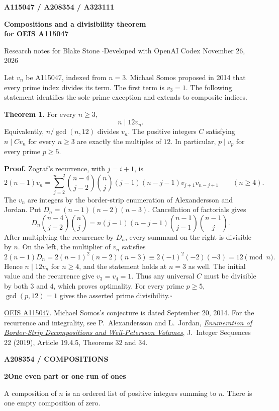 \documentclass[12pt,letterpaper]{article}
\newcommand{\tagline}[1]{{\small\sffamily\bfseries\color{accent}#1}\par}
\newcommand{\titleline}[1]{{\fontsize{23}{27}\selectfont\sffamily\bfseries\color{ink}#1}\par}
\newcommand{\subhead}[1]{\vspace{1pt}{\large\sffamily\bfseries\color{ink}#1}\par}
\newcommand{\lead}[1]{\textbf{\color{ink}#1.}\enspace}
\newcommand{\qedx}{\hfill\(\square\)}
\newcommand{\source}[1]{\vfill{\small\color{muted}#1\par}}
\newcommand{\oeis}[1]{\href{https://oeis.org/#1}{OEIS #1}}
\begin{document}
\thispagestyle{plain}
\tagline{A115047 \enspace / \enspace A208354 \enspace / \enspace A323111}
\titleline{Compositions and a divisibility theorem\\for OEIS A115047}
{\small\sffamily Research notes for Blake Stone \enspace$\cdot$\enspace Developed with OpenAI Codex
 \hfill November 26, 2026}\par
\vspace{6pt}
\subhead{1\quad The smallest universal multiplier}
Let $v_n$ be A115047, indexed from $n=3$. Michael Somos proposed in 2014 that
every prime index divides its term. The first term is $v_3=1$. The following
statement identifies the sole prime exception and extends to composite indices.

\lead{Theorem 1} For every $n\ge3$,
\[
                         n\mid 12v_n .
\]
Equivalently, $n/\gcd(n,12)$ divides $v_n$. The positive integers $C$ satisfying
$n\mid Cv_n$ for every $n\ge3$ are exactly the multiples of $12$. In particular,
$p\mid v_p$ for every prime $p\ge5$.

\lead{Proof} Zograf's recurrence, with $j=i+1$, is
\[
 2(n-1)v_n=\sum_{j=2}^{n-2}\binom{n-4}{j-2}\binom{n}{j}
 (j-1)(n-j-1)v_{j+1}v_{n-j+1}\qquad(n\ge4).
\]
The $v_n$ are integers by the border-strip enumeration of Alexandersson and
Jordan. Put $D_n=(n-1)(n-2)(n-3)$. Cancellation of factorials gives
\[
 D_n\binom{n-4}{j-2}\binom{n}{j}
 =n(j-1)(n-j-1)\binom{n-1}{j-1}\binom{n-1}{j}.
\]
After multiplying the recurrence by $D_n$, every summand on the right is
divisible by $n$. On the left, the multiplier of $v_n$ satisfies
\[
 2(n-1)D_n=2(n-1)^2(n-2)(n-3)\equiv 2(-1)^2(-2)(-3)=12\pmod n .
\]
Hence $n\mid 12v_n$ for $n\ge4$, and the statement holds at $n=3$ as well.
The initial value and the recurrence give $v_3=v_4=1$. Thus any universal $C$
must be divisible by both $3$ and $4$, which proves optimality. For every
prime $p\ge5$, $\gcd(p,12)=1$ gives the asserted prime divisibility.\qedx

\source{\oeis{A115047}. Michael Somos's conjecture is dated September 20, 2014.
For the recurrence and integrality, see P.~Alexandersson and L.~Jordan,
\href{https://cs.uwaterloo.ca/journals/JIS/VOL22/Alexandersson/alex4.pdf}
{\textit{Enumeration of Border-Strip Decompositions and Weil-Petersson Volumes}},
J.\ Integer Sequences 22 (2019), Article 19.4.5, Theorems 32 and 34.}

\newpage
\tagline{A208354 \enspace / \enspace COMPOSITIONS}
\titleline{2\quad One even part or one run of ones}
A composition of $n$ is an ordered list of positive integers summing to $n$.
There is one empty composition of zero.
\end{document}
